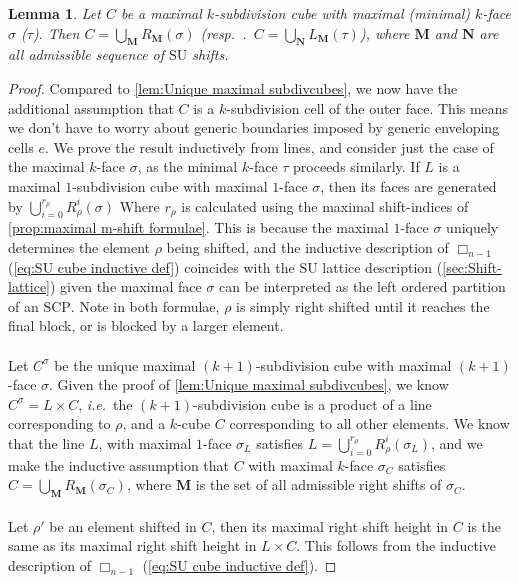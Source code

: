 \documentclass{amsart}
\newtheorem{lemma}[theorem]{Lemma}
\theoremstyle{definition}
\newcommand{\ie}{\textit{i.e.}~} %
\newcommand{\resp}{\textit{resp.}~} %
\newcommand{\SU}{\mathrm{SU}}
\newcommand{\SCP}{\mathrm{SCP}}
\newcommand{\divcube}[1]{\Box_{#1}}
\begin{document}
\begin{lemma}
Let $C$ be a maximal $k$-subdivision cube with  maximal (minimal) $k$-face $\sigma$ ($\tau$).
Then $C = \bigcup_{\mathbf{M}} R_\mathbf{M}(\sigma)$ (\resp.~$C=\bigcup_{\mathbf{N}} L_\mathbf{M}(\tau)$), where $\mathbf{M}$ and $\mathbf{N}$ are all admissible sequence of $\SU$ shifts.

\end{lemma}
\begin{proof}
Compared to \cref{lem:Unique maximal subdivcubes}, we now have the additional assumption that $C$ is a $k$-subdivision cell of the outer face.
This means we don't have to worry about generic boundaries imposed by generic enveloping cells $e$.
We prove the result inductively from lines, and consider just the case of the maximal $k$-face $\sigma$, as the minimal $k$-face $\tau$ proceeds similarly.
If $L$ is a maximal $1$-subdivision cube with maximal $1$-face $\sigma$, then its faces are generated by $\bigcup_{i=0}^{r_\rho} R_\rho^i(\sigma)$
Where $r_\rho$ is calculated using the maximal shift-indices of \cref{prop:maximal m-shift formulae}.
This is because the maximal $1$-face $\sigma$ uniquely determines the element $\rho$ being shifted, and the inductive description of $\divcube{n-1}$ (\cref{eq:SU cube inductive def}) coincides with the $\SU$ lattice description (\cref{sec:Shift-lattice}) given the maximal face $\sigma$ can be interpreted as the left ordered partition of an $\SCP$.
Note in both formulae, $\rho$ is simply right shifted until it reaches the final block, or is blocked by a larger element.
\\\\
Let $C^\sigma$ be the unique maximal $(k+1)$-subdivision cube with maximal $(k+1)$-face $\sigma$.
Given the proof of \cref{lem:Unique maximal subdivcubes}, we know $C^\sigma = L\times C$, \ie the $(k+1)$-subdivision cube is a product of a line corresponding to $\rho$, and a $k$-cube $C$ corresponding to all other elements.
We know that the line $L$, with maximal $1$-face $\sigma_L$ satisfies $L=\bigcup_{i=0}^{r_\rho} R_\rho^i(\sigma_L)$, and we make the inductive assumption that $C$ with maximal $k$-face $\sigma_C$ satisfies $C = \bigcup_{\mathbf{M}}R_\mathbf{M}(\sigma_C)$, where $\mathbf{M}$ is the set of all admissible right shifts of $\sigma_C$.
\\\\
Let $\rho'$ be an element shifted in $C$, then its maximal right shift height in $C$ is the same as its maximal right shift height in $L\times C$.
This follows from the inductive description of $\divcube{n-1}$ (\cref{eq:SU cube inductive def}).

\end{proof}
\end{document}

